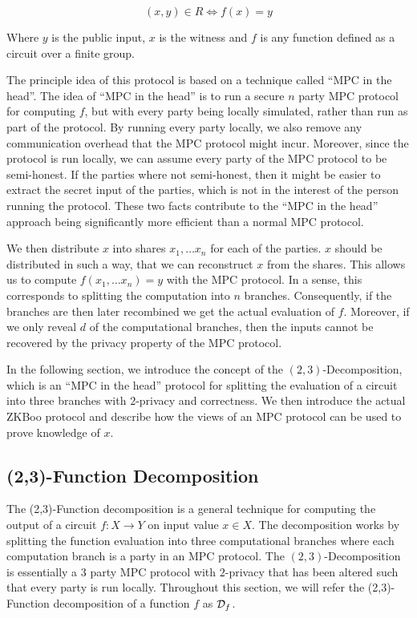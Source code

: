 \[
  (x, y) \in R \iff f(x) = y
\]

Where $y$ is the public input, $x$ is the witness and $f$ is any function
defined as a circuit over a finite group.

The principle idea of this protocol is based on a technique called ``MPC in the
head''. The idea of ``MPC in the head'' is to run a secure $n$ party MPC protocol for computing
$f$, but with every party being locally simulated, rather than run as part of
the protocol.
By running every party locally, we also remove any communication overhead that the MPC
protocol might incur. Moreover, since the protocol is run locally, we can assume
every party of the MPC protocol to be semi-honest. If the parties where not
semi-honest, then it might be easier to extract the secret input of the parties,
which is not in the interest of the person running the protocol.
These two facts contribute to the ``MPC in the head'' approach being significantly
more efficient than a normal MPC protocol.

We then distribute $x$ into shares $x_1, \dots x_{n}$ for each of the parties. $x$ should be
distributed in such a way, that we can reconstruct $x$ from the shares. This
allows us to compute $f(x_{1}, \dots x_{n}) = y$ with the MPC protocol.
In a sense, this corresponds to splitting the computation
into $n$ branches. Consequently, if the branches are then later recombined
we get the actual evaluation of $f$.
Moreover, if we only reveal $d$ of the computational branches, then the inputs
cannot be recovered by the privacy property of the MPC protocol.

In the following section, we introduce the concept of the $(2,3)$-Decomposition,
which is an ``MPC in the head'' protocol for splitting the evaluation of a
circuit into three branches with $2$-privacy and correctness. We then introduce
the actual ZKBoo protocol and describe how the views of an MPC protocol can be
used to prove knowledge of $x$.

\subsection{(2,3)-Function Decomposition}
\label{subsec:decomposition}
The (2,3)-Function decomposition is a general technique for computing the output of
a circuit $f : X \rightarrow Y$ on input value $x \in X$.
The decomposition works by splitting the function evaluation into three
computational branches where each computation branch is a party in an MPC
protocol. The $(2,3)$-Decomposition is essentially a $3$ party MPC protocol with
$2$-privacy that has been altered such that every party is run locally.
Throughout this section, we will refer the (2,3)-Function decomposition
of a function $f$ as $\mathcal{D}_{f}$.

